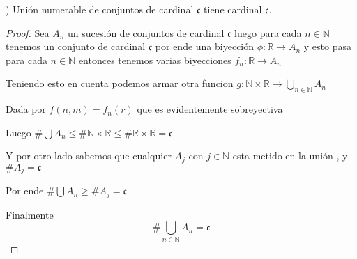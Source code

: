 \documentclass[12pt]{article}
\newcommand{\R}{\mathbb{R}}
\newcommand{\N}{\mathbb{N}}
\newcommand{\ra}{\rightarrow}
\theoremstyle{definition}
\begin{document}
) Unión numerable de conjuntos de cardinal $\mathfrak{c}$ tiene cardinal $\mathfrak{c}$.
\begin{proof}
  Sea $A_{n}$ un sucesión de conjuntos de cardinal $\mathfrak{c}$ luego para cada $n \in \N$ tenemos un conjunto de cardinal $\mathfrak{c}$ por ende una biyección $\phi :\R \ra A_{n}$ y esto pasa para cada $n \in \N$ entonces tenemos varias biyecciones $f_{n} : \R \ra A_{n}$

  Teniendo esto en cuenta podemos armar otra funcion $g: \N \times \R \ra \bigcup_{n \in \N} A_{n} $ 

  Dada por $f(n,m) = f_{n}(r)$ que es evidentemente sobreyectiva 

  Luego $\# \bigcup A_{n} \leq \# \N \times \R \leq \# \R \times \R = \mathfrak{c}$

  Y por otro lado sabemos que cualquier $A_{j}$ con $j \in \N$ esta metido en la unión , y $\# A_{j} = \mathfrak{c}$

  Por ende $\# \bigcup A_{n} \geq \# A_{j} = \mathfrak{c}$

  Finalmente $$\# \bigcup_{n \in \N} A_{n} = \mathfrak{c}$$
\end{proof}
\end{document}

